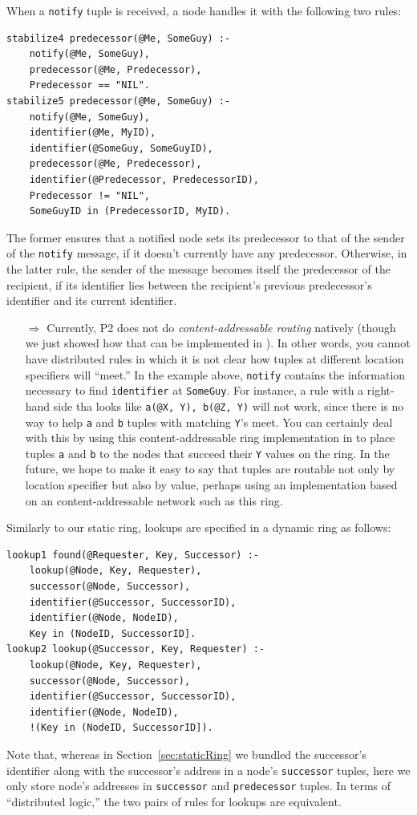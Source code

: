 \documentclass{article}
\begin{document}
When a \lstinline$notify$ tuple is received, a node handles it with the
following two \ol rules:
\begin{lstlisting}
stabilize4 predecessor(@Me, SomeGuy) :-
	notify(@Me, SomeGuy),
	predecessor(@Me, Predecessor),
	Predecessor == "NIL".
stabilize5 predecessor(@Me, SomeGuy) :-
	notify(@Me, SomeGuy),
	identifier(@Me, MyID),
	identifier(@SomeGuy, SomeGuyID),
	predecessor(@Me, Predecessor),
	identifier(@Predecessor, PredecessorID),
	Predecessor != "NIL",
	SomeGuyID in (PredecessorID, MyID).
\end{lstlisting}
The former ensures that a notified node sets its predecessor to that of
the sender of the \lstinline$notify$ message, if it doesn't currently
have any predecessor. Otherwise, in the latter rule, the sender of the
message becomes itself the predecessor of the recipient, if its
identifier lies between the recipient's previous predecessor's identifier and its
current identifier.

\begin{itemize}
\item[$\Longrightarrow$] Currently, P2 does not do
  \emph{content-addressable routing} natively (though we just showed 
  how that can be implemented in \ol). In other words, you cannot have
  distributed rules in which it is not clear how tuples at different
  location specifiers will ``meet.''  In the example above,
  \lstinline$notify$ contains the information necessary to find
  \lstinline$identifier$ at \lstinline$SomeGuy$.  For instance, a rule
  with a right-hand side tha looks like \lstinline$a(@X, Y), b(@Z, Y)$
  will not work, since there is no way to help \lstinline$a$ and
  \lstinline$b$ tuples with matching \lstinline$Y$'s meet.  You can
  certainly deal with this by using this content-addressable ring
  implementation in \ol to place tuples \lstinline$a$ and
  \lstinline$b$ to the nodes that succeed their \lstinline$Y$ values on
  the ring.  In the future,  we hope to make it
  easy to say that tuples are routable not only by location specifier
  but also by value, perhaps using an implementation based on an \ol
  content-addressable network such as this ring.
\end{itemize}


Similarly to our static ring, lookups are specified in a dynamic ring as
follows:
\begin{lstlisting}
lookup1 found(@Requester, Key, Successor) :-
	lookup(@Node, Key, Requester),
	successor(@Node, Successor),
	identifier(@Successor, SuccessorID),
	identifier(@Node, NodeID),
	Key in (NodeID, SuccessorID].
lookup2 lookup(@Successor, Key, Requester) :-
	lookup(@Node, Key, Requester),
	successor(@Node, Successor),
	identifier(@Successor, SuccessorID),
	identifier(@Node, NodeID),
	!(Key in (NodeID, SuccessorID]).
\end{lstlisting}
Note that, whereas in Section~\ref{sec:staticRing} we bundled the
successor's identifier along with the successor's address in a node's
\lstinline$successor$ tuples, here we only store node's addresses in
\lstinline$successor$ and \lstinline$predecessor$ tuples. In terms of
``distributed logic,'' the two pairs of rules for lookups are equivalent.
\end{document}
